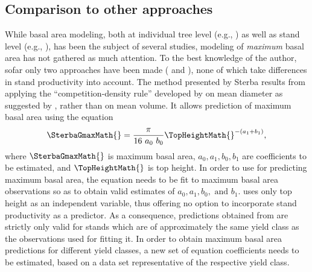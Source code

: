 \subsection{Comparison to other approaches}

While basal area modeling, both at individual tree level (e.g., \textcite{Andreassen2003,Hein2006,Jogiste2000,Monserud1996,Nystroem1997,Schroeder2002,Wimberly1996}) as well as stand level (e.g., \textcite{Castedo-Dorado2007,Chikumbo2001,Chikumbo1999,Eerikaeinen2003}), has been the subject of several studies, modeling of \emph{maximum} basal area has not gathered as much attention.  To the best knowledge of the author, sofar only two approaches have been made (\textcite{Sterba1975,Sterba1987,Sterba1981} and \textcite{Woerdehoff2016}), none of which take differences in stand productivity into account.
The method presented by Sterba results from applying the ``competition-density rule'' developed by \textcite{Kira1953,Ando1968,Ando1968a,Tadaki1963} on mean diameter as suggested by \textcite{Goulding1972}, rather than on mean volume.  It allows prediction of maximum basal area using the equation
\begin{equation}
  \label{eq:SterbaGmax}
  \SterbaGmaxMath{} = \frac{\pi}{16~a_0~b_0} \TopHeightMath{} ^ {-(a_1 + b_1)},
\end{equation}
where \(\SterbaGmaxMath{}\) is maximum basal area, \(a_0, a_1, b_0, b_1\) are coefficients to be estimated, and \(\TopHeightMath{}\) is top height.
In order to use  for predicting maximum basal area, the equation needs to be fit to maximum basal area observations so as to obtain valid estimates of \(a_0, a_1, b_0, \text{ and } b_1\).    uses only top height as an independent variable, thus offering no option to incorporate stand productivity as a predictor.
As a consequence, predictions obtained from  are strictly only valid for stands which are of approximately the same yield class as the observations used for fitting it.  In order to obtain maximum basal area predictions for different yield classes, a new set of equation coefficients needs to be estimated, based on a data set representative of the respective yield class.
